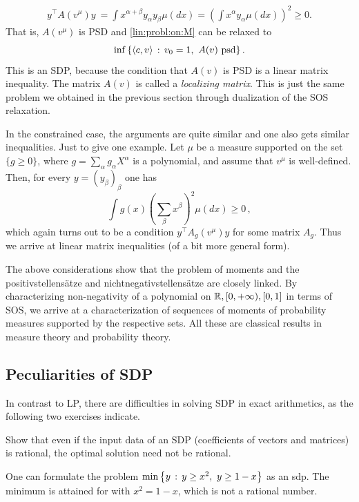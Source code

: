 \begin{align*}
	y^\top A(v^\mu) y \ = \int x^{\alpha + \beta} y_\alpha y_\beta \mu(d x)
 = \left( \int x^\alpha y_\alpha \mu(d x)\right)^2 
 \ge 0.
\end{align*}
That is, $A(v^\mu)$ is PSD and \eqref{lin:probl:on:M} can be relaxed to 
\begin{equation}
	\label{moment:relaxation}
	\inf \left\{ \left\langle c , v \right\rangle \,:\, v_0=1, \ A(v) \ \text{psd} \right\}.
\end{equation}
This is an SDP, because the condition that $A(v)$ is PSD is a linear matrix inequality. The matrix $A(v)$ is called a \emph{localizing matrix}. 
This is just the same problem we obtained in the previous section through dualization of the SOS relaxation. 

In the constrained case, the arguments are quite similar and one also gets similar inequalities. Just to give one example. Let $\mu$ be a measure supported on the set $\{g \ge 0\}$, where $g = \sum_\alpha g_\alpha X^\alpha$ is a polynomial, and assume that $v^\mu$ is well-defined. Then, for every $y=(y_\beta)_\beta$ one has
\[
	\int g(x) \left( \sum_\beta x^\beta \right)^2 \mu( d x) \ge 0 \,,
\] 
which again turns out to be a condition $y^\top A_g(v^\mu) y$ for some matrix $A_g$. Thus we arrive at linear matrix inequalities (of a bit more general form). 

The above considerations show that the problem of moments and the positivstellens{\"a}tze and nichtnegativstellensätze are closely linked. By characterizing non-negativity of a polynomial on $\mathbb{R}, [0,+\infty),[0,1]$ in terms of SOS, we arrive at a characterization of sequences of moments of probability measures supported by the respective sets. All these are classical results in measure theory and probability theory.
 

\subsection{Peculiarities of SDP}

In contrast to LP, there are difficulties in solving SDP in exact arithmetics, as the following two exercises indicate. 

\begin{exercise}
	Show that even if the input data of an SDP (coefficients of vectors and matrices) is rational, the optimal solution need not be rational. 
\end{exercise}
\begin{solution}
	One can formulate the problem $\min \left\{ y \,:\, y \ge x^2, \ y \ge 1 -x \right\}$ as an sdp. The minimum is attained for  with $x^2 = 1 -x$, which is not a rational number.
\end{solution}

